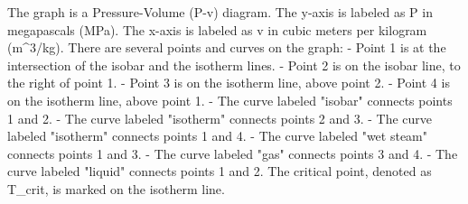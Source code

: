 The graph is a Pressure-Volume (P-v) diagram. The y-axis is labeled as P in megapascals (MPa). The x-axis is labeled as v in cubic meters per kilogram (m^3/kg). There are several points and curves on the graph:
- Point 1 is at the intersection of the isobar and the isotherm lines.
- Point 2 is on the isobar line, to the right of point 1.
- Point 3 is on the isotherm line, above point 2.
- Point 4 is on the isotherm line, above point 1.
- The curve labeled "isobar" connects points 1 and 2.
- The curve labeled "isotherm" connects points 2 and 3.
- The curve labeled "isotherm" connects points 1 and 4.
- The curve labeled "wet steam" connects points 1 and 3.
- The curve labeled "gas" connects points 3 and 4.
- The curve labeled "liquid" connects points 1 and 2.
The critical point, denoted as T_crit, is marked on the isotherm line.
